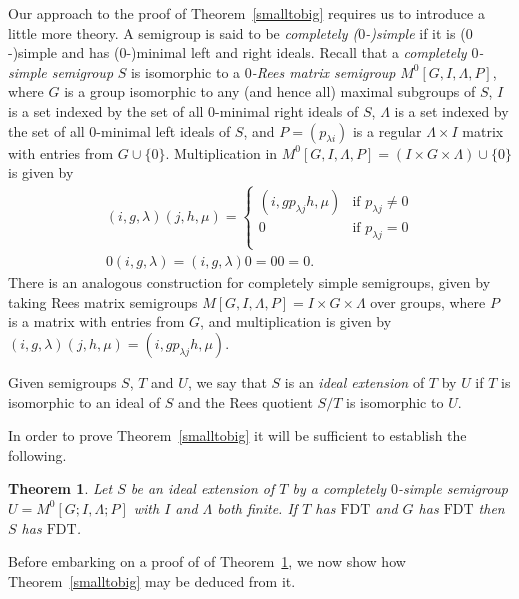 \documentclass[11pt]{amsart}
\newtheorem{thm}{Theorem}
\theoremstyle{plain}
\begin{document}
Our approach to the proof of Theorem~\ref{smalltobig} requires us to introduce a little more theory.  A semigroup is said to be \emph{completely ($0$-)simple} if it is ($0$-)simple and has ($0$-)minimal left and right ideals. Recall that a \emph{completely $0$-simple semigroup} $S$ is isomorphic to a \emph{$0$-Rees matrix semigroup} $M^0[G,I,\Lambda,P]$, where $G$ is a group isomorphic to any (and hence all) maximal subgroups of $S$, $I$ is a set indexed by the set of all $0$-minimal right ideals of $S$, $\Lambda$ is a set indexed by the set of all $0$-minimal left ideals of $S$, and $P = (p_{\lambda i})$ is a regular $\Lambda \times I$ matrix with entries from $G \cup \{ 0 \}$. Multiplication in $M^0[G,I,\Lambda,P] = (I \times G \times \Lambda) \cup \{ 0 \}$ is given by
\[
\begin{array}{c}
(i,g,\lambda)(j,h,\mu) =
\begin{cases}
(i, gp_{\lambda j}h, \mu) & \mbox{if $p_{\lambda j} \neq 0$} \\
0 &  \mbox{if $p_{\lambda j} = 0$} \\
\end{cases} \\
0 (i,g,\lambda) = (i,g,\lambda)0 = 00 = 0.
\end{array}
\]
There is an analogous construction for completely simple semigroups, given by taking Rees matrix semigroups $M[G,I,\Lambda,P] = I \times G \times \Lambda$ over groups, where $P$ is a matrix with entries from $G$, and multiplication is given by $(i,g,\lambda)(j,h,\mu) = (i, gp_{\lambda j}h, \mu)$. 

Given semigroups $S$, $T$ and $U$, we say that $S$ is an \emph{ideal extension} of $T$ by $U$ if $T$ is isomorphic to an ideal of $S$ and the Rees quotient $S/T$ is isomorphic to $U$.

In order to prove Theorem~\ref{smalltobig} it will be sufficient to establish the following.

\begin{thm}\label{comp0simpExt}
Let $S$ be an ideal extension of $T$ by a completely $0$-simple semigroup $U = M^0[G;I,\Lambda;P]$ with $I$ and $\Lambda$ both finite. If $T$ has $\mathrm{FDT}$ and $G$ has $\mathrm{FDT}$ then $S$ has $\mathrm{FDT}$.
\end{thm}

Before embarking on a proof of of Theorem~\ref{comp0simpExt}, we now show how Theorem~\ref{smalltobig} may be deduced from it.
\end{document}

